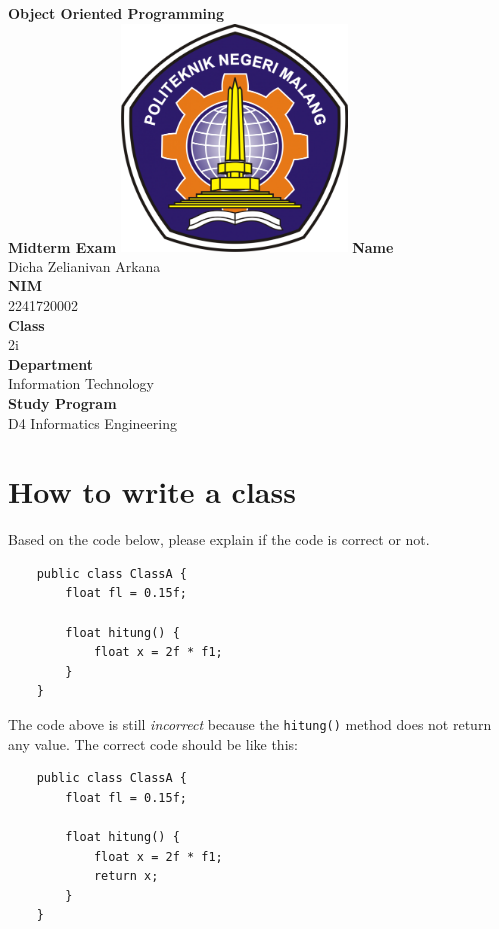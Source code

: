 \documentclass[12pt,titlepage]{article}
\newcommand{\vSubject}{Object Oriented Programming}
\newcommand{\vSubtitle}{Midterm Exam}
\newcommand{\vName}{Dicha Zelianivan Arkana}
\newcommand{\vNIM}{2241720002}
\newcommand{\vClass}{2i}
\newcommand{\vDepartment}{Information Technology}
\newcommand{\vStudyProgram}{D4 Informatics Engineering}
\begin{document}
\begin{titlepage}
    \centering
    \vfill
    {\bfseries\LARGE
        \vSubject\\
        \vskip0.25cm
        \vSubtitle
    }
    \vfill
    \includegraphics[width=6cm]{images/polinema-logo.png}
    \vfill
    {
        \textbf{Name}\\
        \vName\\
        \vskip0.5cm
        \textbf{NIM}\\
        \vNIM\\
        \vskip0.5cm
        \textbf{Class}\\
        \vClass\\
        \vskip0.5cm
        \textbf{Department}\\
        \vDepartment\\
        \vskip0.5cm
        \textbf{Study Program}\\
        \vStudyProgram
    }
\end{titlepage}

\section{How to write a class}
Based on the code below, please explain if the code is correct or not.

\begin{verbatim}
    public class ClassA {
        float fl = 0.15f;

        float hitung() {
            float x = 2f * f1;
        }
    }
\end{verbatim}

The code above is still \textit{incorrect} because the \texttt{hitung()} method does not return any value. The correct code should be like this:

\begin{verbatim}
    public class ClassA {
        float fl = 0.15f;

        float hitung() {
            float x = 2f * f1;
            return x;
        }
    }
\end{verbatim}
\end{document}
